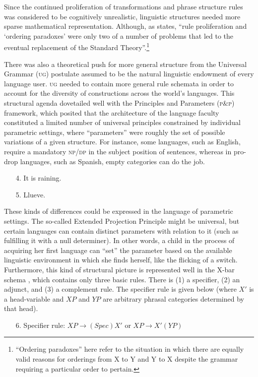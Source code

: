 \documentclass[output=paper]{langscibook}
\begin{document}
Since the continued proliferation of transformations and phrase structure rules was considered to be cognitively unrealistic, linguistic structures needed more sparse mathematical representation. Although, as \cite[24]{Bickerton2014} states, ``rule proliferation and `ordering paradoxes' were only two of a number of problems that led to the eventual replacement of the Standard Theory''.\footnote{``Ordering paradoxes'' here refer to the situation in which there are equally valid reasons for orderings from X to Y and Y to X despite the grammar requiring a particular order to pertain.}

There was also a theoretical push for more general structure from the Universal Grammar (\textsc{ug}) postulate assumed to be the natural linguistic endowment of every language user. \textsc{ug} needed to contain more general rule schemata in order to account for the diversity of constructions across the world's languages. This structural agenda dovetailed well with the Principles and Parameters (\textsc{p\&p}) framework, which posited that the architecture of the language faculty constituted a limited number of universal principles constrained by individual parametric settings, where ``parameters'' were roughly the set of possible variations of a given structure. For instance, some languages, such as English, require a mandatory \textsc{np}/\textsc{dp} in the subject position of sentences, whereas in pro-drop languages, such as Spanish, empty categories can do the job. 

\begin{enumerate}
    \item[4.] It is raining.
    \item[5.] Llueve.
\end{enumerate}

These kinds of differences could be expressed in the language of parametric settings. The so-called Extended Projection Principle might be universal, but certain languages can contain distinct parameters with relation to it (such as fulfilling it with a null determiner). In other words, a child in the process of acquiring her first language can ``set'' the parameter based on the available linguistic environment in which she finds herself, like the flicking of a switch. Furthermore, this kind of structural picture is represented well in the X-bar schema \citep{Jackendoff1977}, which contains only three basic rules. There is (1) a specifier, (2) an adjunct, and (3) a complement rule. The specifier rule is given below (where $X'$ is a head-variable and $XP$ and $YP$ are arbitrary phrasal categories determined by that head).
\begin{itemize}
\item[6.] Specifier rule: $XP\rightarrow (Spec)X'$ or $XP\rightarrow X'(YP)$
\end{itemize}
\end{document}

